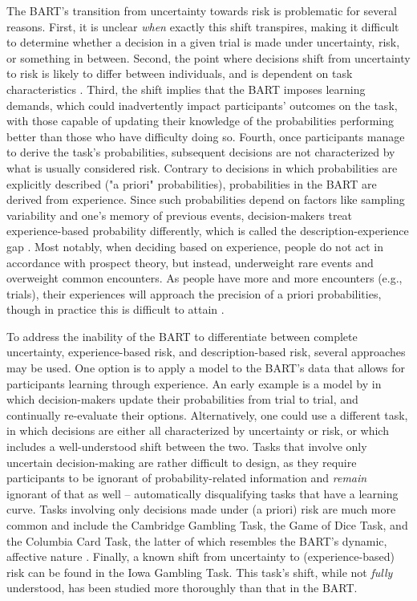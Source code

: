 \documentclass[serif, twocolumn, authordate, meta]{jote-article}
\begin{document}
The BART's transition from uncertainty towards risk is problematic for several reasons. First, it is unclear \emph{when} exactly this shift transpires, making it difficult to determine whether a decision in a given trial is made under uncertainty, risk, or something in between. Second, the point where decisions shift from uncertainty to risk is likely to differ between individuals, and is dependent on task characteristics \parencite{Brand2006,Brand2007}. Third, the shift implies that the BART imposes learning demands, which could inadvertently impact participants' outcomes on the task, with those capable of updating their knowledge of the probabilities performing better than those who have difficulty doing so. Fourth, once participants manage to derive the task's probabilities, subsequent decisions are not characterized by what is usually considered risk. Contrary to decisions in which probabilities are explicitly described ("a priori" probabilities), probabilities in the BART are derived from experience. Since such probabilities depend on factors like sampling variability and one's memory of previous events, decision-makers treat experience-based probability differently, which is called the description-experience gap \parencite{Hau2008,Rakow2010}. Most notably, when deciding based on experience, people do not act in accordance with prospect theory, but instead, underweight rare events and overweight common encounters. As people have more and more encounters (e.g., trials), their experiences will approach the precision of a priori probabilities, though in practice this is difficult to attain \parencite{Knight1921}.

\label{sec:riskp5}
To address the inability of the BART to differentiate between complete uncertainty, experience-based risk, and description-based risk, several approaches may be used. One option is to apply a model to the BART's data that allows for participants learning through experience. An early example is a model by \textcite{Wallsten2005} in which decision-makers update their probabilities from trial to trial, and continually re-evaluate their options. Alternatively, one could use a different task, in which decisions are either all characterized by uncertainty or risk, or which includes a well-understood shift between the two. Tasks that involve only uncertain decision-making are rather difficult to design, as they require participants to be ignorant of probability-related information and \emph{remain} ignorant of that as well -- automatically disqualifying tasks that have a learning curve. Tasks involving only decisions made under (a priori) risk are much more common and include the Cambridge Gambling Task, the Game of Dice Task, and the Columbia Card Task, the latter of which resembles the BART's dynamic, affective nature \parencite{Schonberg2011}. Finally, a known shift from uncertainty to (experience-based) risk can be found in the Iowa Gambling Task. This task's shift, while not \emph{fully} understood, has been studied more thoroughly than that in the BART.
\end{document}
